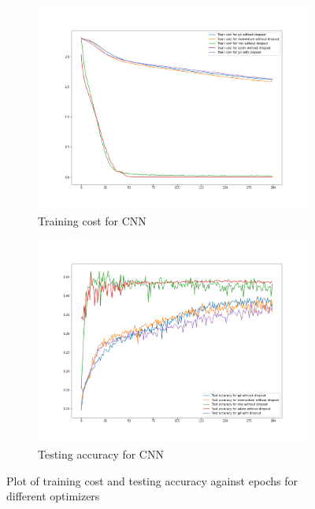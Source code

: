 \begin{figure}[H]
    \begin{subfigure}{0.5\textwidth}
        \centering
        \includegraphics[width=1\linewidth]{assets/plots1/q3_1.png}
        \caption{Training cost for CNN}
        \label{fig:3_a}
    \end{subfigure}
    \begin{subfigure}{0.5\textwidth}
        \centering
        \includegraphics[width=1\linewidth]{assets/plots1/q3_2.png}
        \caption{Testing accuracy for CNN}
        \label{fig:3_b}
    \end{subfigure}
    \caption{Plot of training cost and testing accuracy against epochs for different optimizers}
    \label{fig:3}
\end{figure}


